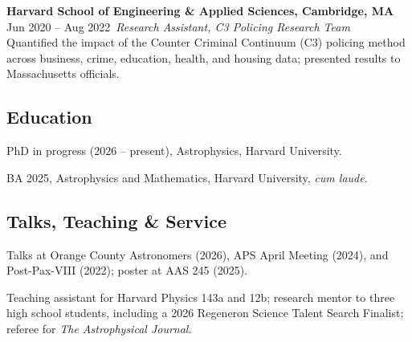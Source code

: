 \documentclass[11pt,letterpaper]{article}
\begin{document}
\begin{list}{}{\cvlist}
    \item
        \textbf{Harvard School of Engineering \& Applied Sciences, Cambridge, MA} \\
        {\color{numcolor} Jun 2020 -- Aug 2022}\,
        \emph{Research Assistant, C3 Policing Research Team} \\
        Quantified the impact of the Counter Criminal Continuum (C3) policing method across business, crime, education, health, and housing data; presented results to Massachusetts officials.
\end{list}

\subsection{Education}
\begin{list}{}{\cvlist}
  \item
        PhD in progress (2026 -- present), Astrophysics, Harvard University.
  \item
        BA 2025, Astrophysics and Mathematics, Harvard University, \emph{cum laude}.
\end{list}

\subsection{Talks, Teaching \& Service}
\begin{list}{}{\cvlist}
  \item Talks at Orange County Astronomers (2026), APS April Meeting (2024), and Post-Pax-VIII (2022); poster at AAS 245 (2025).
  \item Teaching assistant for Harvard Physics 143a and 12b; research mentor to three high school students, including a 2026 Regeneron Science Talent Search Finalist; referee for \emph{The Astrophysical Journal}.
\end{list}
\end{document}

